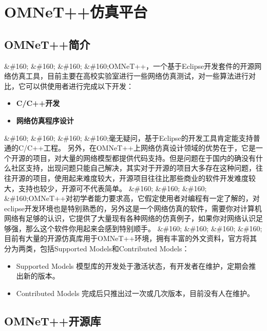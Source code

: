 \chapter{OMNeT++仿真平台}
\label{omnet仿真平台}

\section{OMNeT++简介}
\label{omnet简介}

\&\#160; \&\#160; \&\#160; \&\#160;OMNeT++，一个基于Eclipse开发套件的开源网络仿真工具，目前主要在高校实验室进行一些网络仿真测试，对一些算法进行对比，它可以供使用者进行完成以下开发：

\begin{itemize}
\item \textbf{C\slash C++开发}

\item \textbf{网络仿真程序设计}

\end{itemize}

\&\#160; \&\#160; \&\#160; \&\#160;毫无疑问，基于Eclipse的开发工具肯定能支持普通的C\slash C++工程。
另外，在OMNeT++上网络仿真设计领域的优势在于，它是一个开源的项目，对大量的网络模型都提供代码支持。但是问题在于国内的确没有什么社区支持，出现问题只能自己解决，其实对于开源的项目大多存在这种问题，往往开源的项目，使用起来难度较大，开源项目往往比那些商业的软件开发难度较大，支持也较少，开源可不代表简单。
\&\#160; \&\#160; \&\#160; \&\#160;OMNeT++对初学者能力要求高，它假定使用者对编程有一定了解的，对eclipse开发环境也是特别熟悉的，另外这是一个网络仿真的软件，需要你对计算机网络有足够的认识，它提供了大量现有各种网络的仿真例子，如果你对网络认识足够强，那么这个软件你用起来会感到特别顺手。
\&\#160; \&\#160; \&\#160; \&\#160;目前有大量的开源仿真库用于OMNeT++环境，拥有丰富的外文资料，官方将其分为两类，包括Supported Models和Contributed Models：

\begin{itemize}
\item Supported Models
模型库的开发处于激活状态，有开发者在维护，定期会推出新的版本。

\item Contributed Models
完成后只推出过一次或几次版本，目前没有人在维护。

\end{itemize}

\section{OMNeT++开源库}
\label{omnet开源库}

